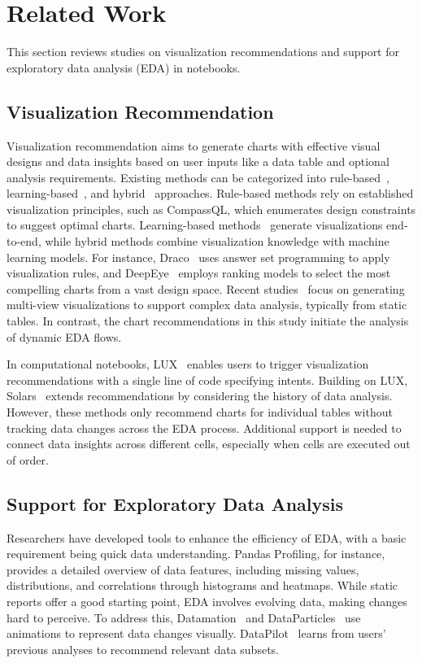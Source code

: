 \section{Related Work}
This section reviews studies on visualization recommendations and support for exploratory data analysis (EDA) in notebooks.

\subsection{Visualization Recommendation}
Visualization recommendation aims to generate charts with effective visual designs and data insights based on user inputs like a data table and optional analysis requirements. Existing methods can be categorized into rule-based~\cite{seedb, compassql, voyager, apt}, learning-based~\cite{vizml, data2vis, kg4vis}, and hybrid~\cite{deepeye, deepeye2,draco} approaches. Rule-based methods rely on established visualization principles, such as CompassQL, which enumerates design constraints to suggest optimal charts. Learning-based methods~\cite{vizml, data2vis, kg4vis, vislearning, table2charts} generate visualizations end-to-end, while hybrid methods combine visualization knowledge with machine learning models. For instance, Draco~\cite{draco} uses answer set programming to apply visualization rules, and DeepEye~\cite{deepeye, deepeye2} employs ranking models to select the most compelling charts from a vast design space. Recent studies~\cite{calliope, erato, datashot, dashbot, multivision, dminer, composition, pi2} focus on generating multi-view visualizations to support complex data analysis, typically from static tables. In contrast, the chart recommendations in this study initiate the analysis of dynamic EDA flows.

In computational notebooks, LUX~\cite{lee2021lux} enables users to trigger visualization recommendations with a single line of code specifying intents. Building on LUX, Solars~\cite{epperson2022leveraging} extends recommendations by considering the history of data analysis. However, these methods only recommend charts for individual tables without tracking data changes across the EDA process. Additional support is needed to connect data insights across different cells, especially when cells are executed out of order.



\subsection{Support for Exploratory Data Analysis}
Researchers have developed tools to enhance the efficiency of EDA, with a basic requirement being quick data understanding. Pandas Profiling, for instance, provides a detailed overview of data features, including missing values, distributions, and correlations through histograms and heatmaps. While static reports offer a good starting point, EDA involves evolving data, making changes hard to perceive. To address this, Datamation~\cite{datamation} and DataParticles~\cite{dataparticles} use animations to represent data changes visually. DataPilot~\cite{datapilot} learns from users' previous analyses to recommend relevant data subsets.

